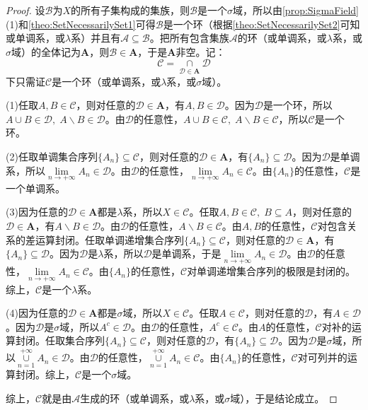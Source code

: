 \begin{proof}
	设$\mathscr{B}$为$X$的所有子集构成的集族，则$\mathscr{B}$是一个$\sigma$域，所以由\cref{prop:SigmaField}(1)和\cref{theo:SetNecessarilySet1}可得$\mathscr{B}$是一个环（根据\cref{theo:SetNecessarilySet2}可知或单调系，或$\lambda$系）并且有$\mathscr{A}\subseteq\mathscr{B}$。把所有包含集族$\mathscr{A}$的环（或单调系，或$\lambda$系，或$\sigma$域）的全体记为$\mathbf{A}$，则$\mathscr{B}\in \mathbf{A}$，于是$\mathbf{A}$非空。记：
	\begin{equation*}
		\mathscr{C}=\underset{\mathscr{D}\in \mathbf{A}}{\cap}\mathscr{D}
	\end{equation*}
	下只需证$\mathscr{C}$是一个环（或单调系，或$\lambda$系，或$\sigma$域）。\par
	(1)任取$A,B\in\mathscr{C}$，则对任意的$\mathscr{D}\in\mathbf{A}$，有$A,B\in\mathscr{D}$。因为$\mathscr{D}$是一个环，所以$A\cup B\in\mathscr{D},\;A\backslash B\in\mathscr{D}$。由$\mathscr{D}$的任意性，$A\cup B\in\mathscr{C},\;A\backslash B\in\mathscr{C}$，所以$\mathscr{C}$是一个环。\par
	(2)任取单调集合序列$\{A_n\}\subseteq\mathscr{C}$，则对任意的$\mathscr{D}\in\mathbf{A}$，有$\{A_n\}\subseteq\mathscr{D}$。因为$\mathscr{D}$是单调系，所以$\lim\limits_{n\to+\infty}A_n\in\mathscr{D}$。由$\mathscr{D}$的任意性，$\lim\limits_{n\to+\infty}A_n\in\mathscr{C}$。由$\{A_n\}$的任意性，$\mathscr{C}$是一个单调系。\par
	(3)因为任意的$\mathscr{D}\in\mathbf{A}$都是$\lambda$系，所以$X\in\mathscr{C}$。任取$A,B\in\mathscr{C},\;B\subseteq A$，则对任意的$\mathscr{D}\in\mathbf{A}$，有$A\backslash B\in\mathscr{D}$。由$\mathscr{D}$的任意性，$A\backslash B\in\mathscr{C}$。由$A,B$的任意性，$\mathscr{C}$对包含关系的差运算封闭。任取单调递增集合序列$\{A_n\}\subseteq\mathscr{C}$，则对任意的$\mathscr{D}\in\mathbf{A}$，有$\{A_n\}\subseteq\mathscr{D}$。因为$\mathscr{D}$是$\lambda$系，所以$\mathscr{D}$是单调系，于是$\lim\limits_{n\to+\infty}A_n\in\mathscr{D}$。由$\mathscr{D}$的任意性，$\lim\limits_{n\to+\infty}A_n\in\mathscr{C}$。由$\{A_n\}$的任意性，$\mathscr{C}$对单调递增集合序列的极限是封闭的。综上，$\mathscr{C}$是一个$\lambda$系。\par
	(4)因为任意的$\mathscr{D}\in\mathbf{A}$都是$\sigma$域，所以$X\in\mathscr{C}$。任取$A\in\mathscr{C}$，则对任意的$\mathscr{D}$，有$A\in\mathscr{D}$。因为$\mathscr{D}$是$\sigma$域，所以$A^c\in\mathscr{D}$。由$\mathscr{D}$的任意性，$A^c\in\mathscr{C}$。由$A$的任意性，$\mathscr{C}$对补的运算封闭。任取集合序列$\{A_n\}\subseteq\mathscr{C}$，则对任意的$\mathscr{D}$，有$\{A_n\}\subseteq\mathscr{D}$。因为$\mathscr{D}$是$\sigma$域，所以$\underset{n=1}{\overset{+\infty}{\cup}}A_n\in\mathscr{D}$。由$\mathscr{D}$的任意性，$\underset{n=1}{\overset{+\infty}{\cup}}A_n\in\mathscr{C}$。由$\{A_n\}$的任意性，$\mathscr{C}$对可列并的运算封闭。综上，$\mathscr{C}$是一个$\sigma$域。\par
	综上，$\mathscr{C}$就是由$\mathscr{A}$生成的环（或单调系，或$\lambda$系，或$\sigma$域），于是结论成立。
\end{proof}
